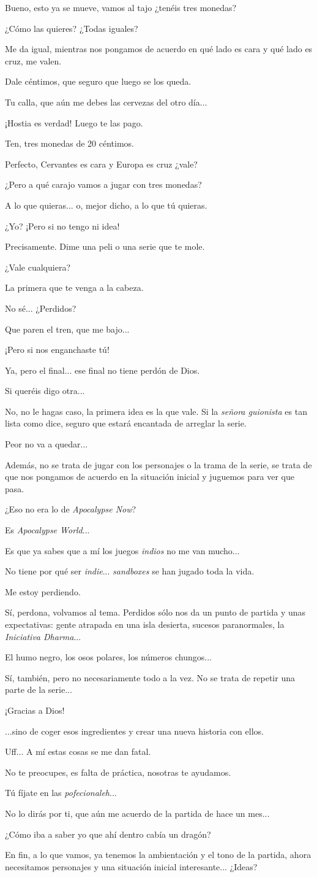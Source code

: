 \documentclass[10pt, a5paper, twocolumn]{article}
\newenvironment{dialogue}
    {\begin{description}[leftmargin=!,align=right,labelwidth=0.cm]}
    {\end{description}}
\newcommand\A{\item[\raisebox{-0.25em}{\scalebox{0.75}{\bctetraedre}}]}
\newcommand\B{\item[\raisebox{-0.25em}{\scalebox{0.75}{\bccube}}]}
\newcommand\E{\item[\raisebox{-0.25em}{\scalebox{0.75}{\bcicosaedre}}]}
\begin{document}
    \begin{dialogue}
        \E Bueno, esto ya se mueve, vamos al tajo ¿tenéis tres monedas?
        \A ¿Cómo las quieres? ¿Todas iguales?
        \E Me da igual, mientras nos pongamos de acuerdo en qué lado es cara y qué lado es cruz, me valen.
        \B Dale céntimos, que seguro que luego se los queda.
        \E Tu calla, que aún me debes las cervezas del otro día...
        \B ¡Hostia es verdad! Luego te las pago.
        \A Ten, tres monedas de 20 céntimos.
        \E Perfecto, Cervantes es cara y Europa es cruz ¿vale?
        \B ¿Pero a qué carajo vamos a jugar con tres monedas? 
        \E A lo que quieras... o, mejor dicho, a lo que tú quieras.
        \A ¿Yo? ¡Pero si no tengo ni idea!
        \E Precisamente. Dime una peli o una serie que te mole.
        \A ¿Vale cualquiera?
        \E La primera que te venga a la cabeza.
        \A No sé... ¿Perdidos?
        \B Que paren el tren, que me bajo...
        \E ¡Pero si nos enganchaste tú!
        \B Ya, pero el final... ese final no tiene perdón de Dios.
        \A Si queréis digo otra...
        \E No, no le hagas caso, la primera idea es la que vale. Si la \emph{señora guionista} es tan lista como dice, seguro que estará encantada de arreglar la serie.
        \B Peor no va a quedar...
        \E Además, no se trata de jugar con los personajes o la trama de la serie, se trata de que nos pongamos de acuerdo en la situación inicial y juguemos para ver que pasa.
        \B ¿Eso no era lo de \emph{Apocalypse Now}?
        \E Es \emph{Apocalypse World}...
        \B Es que ya sabes que a mí los juegos \emph{indios} no me van mucho...
        \E No tiene por qué ser \emph{indie}... \emph{sandboxes} se han jugado toda la vida.
        \A Me estoy perdiendo.
        \E Sí, perdona, volvamos al tema. Perdidos sólo nos da un punto de partida y unas expectativas: gente atrapada en una isla desierta, sucesos paranormales, la \emph{Iniciativa Dharma}...
        \A El humo negro, los osos polares, los números chungos...
        \E Sí, también, pero no necesariamente todo a la vez. No se trata de repetir una parte de la serie...
        \B ¡Gracias a Dios!
        \E ...sino de coger esos ingredientes y crear una nueva historia con ellos.
        \A Uff... A mí estas cosas se me dan fatal.
        \E No te preocupes, es falta de práctica, nosotras te ayudamos.
        \B Tú fíjate en las \emph{pofecionaleh}...
        \E No lo dirás por ti, que aún me acuerdo de la partida de hace un mes...
        \B ¿Cómo iba a saber yo que ahí dentro cabía un dragón?
        \E En fin, a lo que vamos, ya tenemos la ambientación y el tono de la partida, ahora necesitamos personajes y una situación inicial interesante... ¿Ideas?

\end{dialogue}
\end{document}
